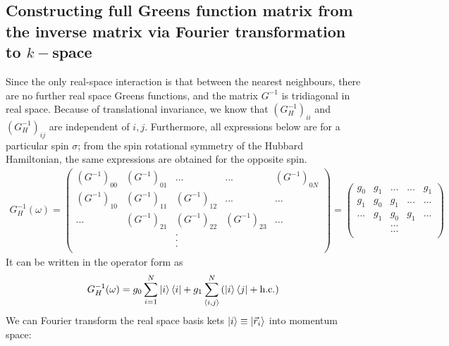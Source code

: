 \documentclass[12pt]{article}
\numberwithin{equation}{section}
\begin{document}
\subsection{Constructing full Greens function matrix from the inverse matrix via Fourier transformation to \(k-\)space}
Since the only real-space interaction is that between the nearest neighbours, there are no further real space Greens functions, and the matrix $G^{-1}$ is tridiagonal in real space. Because of translational invariance, we know that $\left(G_H^{-1}\right)_{ii}$ and $\left(G_H^{-1}\right)_{ij}$ are independent of $i,j$. Furthermore, all expressions below are for a particular spin $\sigma$; from the spin rotational symmetry of the Hubbard Hamiltonian, the same expressions are obtained for the opposite spin.
\begin{equation}\begin{aligned}
	G^{-1}_H(\omega) = \begin{pmatrix} \left(G^{-1}\right)_{00} & \left(G^{-1}\right)_{01} & ... & ... & \left(G^{-1}\right)_{0N}\\
		\left(G^{-1}\right)_{10} & \left(G^{-1}\right)_{11} & \left(G^{-1}\right)_{12} & ... & ...\\
		... & \left(G^{-1}\right)_{21} & \left(G^{-1}\right)_{22} & \left(G^{-1}\right)_{23} & ... \\
		    &&.&&\\
		    &&.&&\\
		    &&.&&\\
\end{pmatrix} = \begin{pmatrix} g_0 & g_1 & ... & ... & g_1\\
		g_1 & g_0 & g_1 & ... & ...\\
		... & g_1 & g_0 & g_1 & ... \\
		    &&...&&\\
		    &&...&&\\
\end{pmatrix} 
\end{aligned}\end{equation}
It can be written in the operator form as
\begin{equation}\begin{aligned}
	G_H^{-1}(\omega) = g_0\sum_{i=1}^N\ket{i}\bra{i} + g_1\sum_{\left<i,j \right>}^N\left( \ket{i}\bra{j} + \text{h.c.}\right)
\end{aligned}\end{equation}
We can Fourier transform the real space basis kets $\ket{i} \equiv \ket{\vec r_i}$ into momentum space:
\end{document}
